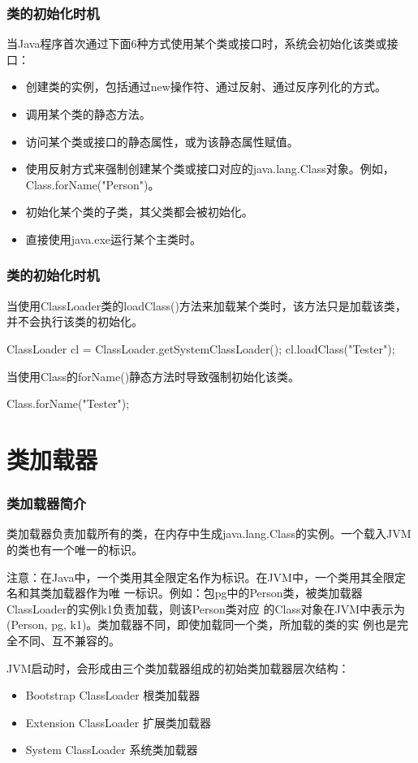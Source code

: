 \documentclass[hyperref={pdfpagelabels=false},compress,table]{beamer} %
\newcommand{\kai}{\CJKfamily{KaiTi}}
\begin{document}
\begin{frame}[fragile] %
\frametitle{类的初始化时机}

当Java程序首次通过下面6种方式使用某个类或接口时，系统会初始化该类或接口：
\begin{itemize}\kai
\item 创建类的实例，包括通过new操作符、通过反射、通过反序列化的方式。
\item 调用某个类的静态方法。
\item 访问某个类或接口的静态属性，或为该静态属性赋值。
\item 使用反射方式来强制创建某个类或接口对应的java.lang.Class对象。例如，Class.forName("Person")。
\item 初始化某个类的子类，其父类都会被初始化。
\item 直接使用java.exe运行某个主类时。
\end{itemize}


\end{frame}

\begin{frame}[fragile] %
\frametitle{类的初始化时机}

当使用ClassLoader类的loadClass()方法来加载某个类时，该方法只是加载该类，并不会执行该类的初始化。

\begin{javaCode}
ClassLoader cl = ClassLoader.getSystemClassLoader();
cl.loadClass("Tester");  
\end{javaCode}

当使用Class的forName()静态方法时导致强制初始化该类。
\begin{javaCode}
Class.forName("Tester");  
\end{javaCode}
\end{frame}

\section{类加载器}

\begin{frame}[fragile] %
\frametitle{类加载器简介}

类加载器负责加载所有的类，在内存中生成java.lang.Class的实例。一个载入JVM的类也有一个唯一的标识。

注意：在Java中，一个类用其全限定名作为标识。在JVM中，一个类用其全限定名和其类加载器作为唯
一标识。例如：包pg中的Person类，被类加载器ClassLoader的实例k1负责加载，则该Person类对应
的Class对象在JVM中表示为(Person, pg, k1)。类加载器不同，即使加载同一个类，所加载的类的实
例也是完全不同、互不兼容的。

JVM启动时，会形成由三个类加载器组成的初始类加载器层次结构：
\begin{itemize}\kai
\item Bootstrap ClassLoader  根类加载器
\item Extension ClassLoader  扩展类加载器
\item System ClassLoader  系统类加载器
\end{itemize}
\end{frame}
\end{document}
